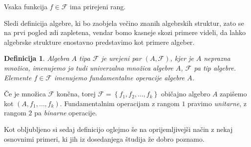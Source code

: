 \documentclass[a4paper,11pt]{article}
\newtheorem{definicija}{Definicija}
\begin{document}
Vsaka funkcija $f \in \mathcal{F}$ ima prirejeni rang. 

Sledi definicija algebre, ki bo zaobjela večino znanih algebrskih struktur, zato se na prvi pogled zdi zapletena, 
vendar bomo kasneje skozi primere videli, da lahko algebrske strukture enostavno predstavimo kot primere algeber. 

\begin{definicija} \emph{Algebra $A$} tipa $\mathcal{F}$ je urejeni par $\left(A, \mathcal{F}\right)$, kjer je $A$ neprazna 
množica, imenujemo jo tudi \emph{univerzalna množica} algebre $A$, $\mathcal{F}$ pa \emph{tip} algebre. Elemente $f \in 
\mathcal{F}$ imenujemo \emph{fundamentalne operacije} algebre $A$. 
\end{definicija}

Če je množica $\mathcal{F}$ končna, torej $\mathcal{F} = \left\{f_1, f_2, \dots, f_k\right\}$ običajno algebro $A$ 
zapišemo kot $\left(A, f_1, \dots, f_k\right)$. Fundamentalnim operacijam z rangom $1$ pravimo \emph{unitarne}, z rangom $2$ 
pa \emph{binarne} operacije.

Kot obljubljeno si sedaj definicijo oglejmo še na oprijemljivejši način z nekaj osnovnimi primeri, ki jih iz dosedanjega
študija že dobro poznamo.
\end{document}
